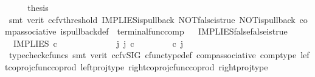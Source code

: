 \begin{isabellebody}
\ \ \isamarkupfalse%
\ \isamarkupfalse%
\ {\isacharquery}{\kern0pt}thesis\isanewline
\ \ \ \ \isamarkupfalse%
\ {\isacharparenleft}{\kern0pt}smt\ {\isacharparenleft}{\kern0pt}verit{\isacharcomma}{\kern0pt}\ ccfv{\isacharunderscore}{\kern0pt}threshold{\isacharparenright}{\kern0pt}\ IMPLIES{\isacharunderscore}{\kern0pt}is{\isacharunderscore}{\kern0pt}pullback\ NOT{\isacharunderscore}{\kern0pt}false{\isacharunderscore}{\kern0pt}is{\isacharunderscore}{\kern0pt}true\ NOT{\isacharunderscore}{\kern0pt}is{\isacharunderscore}{\kern0pt}pullback\ comp{\isacharunderscore}{\kern0pt}associative{}\ is{\isacharunderscore}{\kern0pt}pullback{\isacharunderscore}{\kern0pt}def\ \ terminal{\isacharunderscore}{\kern0pt}func{\isacharunderscore}{\kern0pt}comp{\isacharparenright}{\kern0pt}\isanewline
{}\isamarkupfalse%
%
\endisatagproof
{\isafoldproof}%
%
\isadelimproof
\ \isanewline
%
\endisadelimproof
\isanewline
{}\isamarkupfalse%
\ IMPLIES{\isacharunderscore}{\kern0pt}false{\isacharunderscore}{\kern0pt}false{\isacharunderscore}{\kern0pt}is{\isacharunderscore}{\kern0pt}true{\isacharcolon}{\kern0pt}\isanewline
\ \ {\isachardoublequoteopen}IMPLIES\ {\isasymcirc}\isactrlsub c\ \ {\isasymlangle}{\isasymf}{\isacharcomma}{\kern0pt}{\isasymf}{\isasymrangle}\ {\isacharequal}{\kern0pt}\ {\isasymt}{\isachardoublequoteclose}\isanewline
%
\isadelimproof
%
\endisadelimproof
%
\isatagproof
{}\isamarkupfalse%
\ {\isacharminus}{\kern0pt}\ \ \ \isanewline
\ \ \isamarkupfalse%
\ {\isachardoublequoteopen}{\isasymexists}\ j{\isachardot}{\kern0pt}\ j\ {\isasymin}\isactrlsub c\ {\isasymone}{\isasymCoprod}{\isacharparenleft}{\kern0pt}{\isasymone}{\isasymCoprod}{\isasymone}{\isacharparenright}{\kern0pt}\ {\isasymand}\ {\isacharparenleft}{\kern0pt}{\isasymlangle}{\isasymt}{\isacharcomma}{\kern0pt}\ {\isasymt}{\isasymrangle}{\isasymamalg}\ {\isacharparenleft}{\kern0pt}{\isasymlangle}{\isasymf}{\isacharcomma}{\kern0pt}\ {\isasymf}{\isasymrangle}\ {\isasymamalg}{\isasymlangle}{\isasymf}{\isacharcomma}{\kern0pt}\ {\isasymt}{\isasymrangle}{\isacharparenright}{\kern0pt}{\isacharparenright}{\kern0pt}\ {\isasymcirc}\isactrlsub c\ j\ \ {\isacharequal}{\kern0pt}\ {\isasymlangle}{\isasymf}{\isacharcomma}{\kern0pt}{\isasymf}{\isasymrangle}{\isachardoublequoteclose}\isanewline
\ \ \ \ \isamarkupfalse%
\ {\isacharparenleft}{\kern0pt}typecheck{\isacharunderscore}{\kern0pt}cfuncs{\isacharcomma}{\kern0pt}\ smt\ {\isacharparenleft}{\kern0pt}verit{\isacharcomma}{\kern0pt}\ ccfv{\isacharunderscore}{\kern0pt}SIG{\isacharparenright}{\kern0pt}\ cfunc{\isacharunderscore}{\kern0pt}type{\isacharunderscore}{\kern0pt}def\ comp{\isacharunderscore}{\kern0pt}associative\ comp{\isacharunderscore}{\kern0pt}type\ left{\isacharunderscore}{\kern0pt}coproj{\isacharunderscore}{\kern0pt}cfunc{\isacharunderscore}{\kern0pt}coprod\ left{\isacharunderscore}{\kern0pt}proj{\isacharunderscore}{\kern0pt}type\ right{\isacharunderscore}{\kern0pt}coproj{\isacharunderscore}{\kern0pt}cfunc{\isacharunderscore}{\kern0pt}coprod\ right{\isacharunderscore}{\kern0pt}proj{\isacharunderscore}{\kern0pt}type{\isacharparenright}{\kern0pt}\isanewline

\end{isabellebody}
